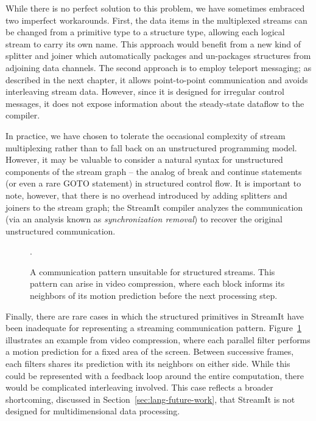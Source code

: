   While there is no perfect solution to this problem, we have
  sometimes embraced two imperfect workarounds.  First, the data items
  in the multiplexed streams can be changed from a primitive type to a
  structure type, allowing each logical stream to carry its own name.
  This approach would benefit from a new kind of splitter and joiner
  which automatically packages and un-packages structures from
  adjoining data channels.  The second approach is to employ teleport
  messaging; as described in the next chapter, it allows
  point-to-point communication and avoids interleaving stream data.
  However, since it is designed for irregular control messages, it
  does not expose information about the steady-state dataflow to the
  compiler.

  In practice, we have chosen to tolerate the occasional complexity of
  stream multiplexing rather than to fall back on an unstructured
  programming model.  However, it may be valuable to consider a
  natural syntax for unstructured components of the stream graph --
  the analog of break and continue statements (or even a rare GOTO
  statement) in structured control flow. It is important to note,
  however, that there is no overhead introduced by adding splitters
  and joiners to the stream graph; the StreamIt compiler analyzes the
  communication (via an analysis known as {\it synchronization
  removal}) to recover the original unstructured communication.

\begin{figure}[t]
\centering
{}

\caption[A communication pattern unsuitable for structured streams.]{A
  communication pattern unsuitable for structured streams.  This
  pattern can arise in video compression, where each block informs its
  neighbors of its motion prediction before the next processing
  step.\protect\label{fig:inadequate}}.
\vspace{-12pt}
\end{figure}
\enlargethispage{0.3\baselineskip}

  Finally, there are rare cases in which the structured primitives in
  StreamIt have been inadequate for representing a streaming
  communication pattern.  Figure~\ref{fig:inadequate} illustrates an
  example from video compression, where each parallel filter performs
  a motion prediction for a fixed area of the screen.  Between
  successive frames, each filters shares its prediction with its
  neighbors on either side.  While this could be represented with a
  feedback loop around the entire computation, there would be
  complicated interleaving involved.  This case reflects a broader
  shortcoming, discussed in Section~\ref{sec:lang-future-work}, that
  StreamIt is not designed for multidimensional data processing.

